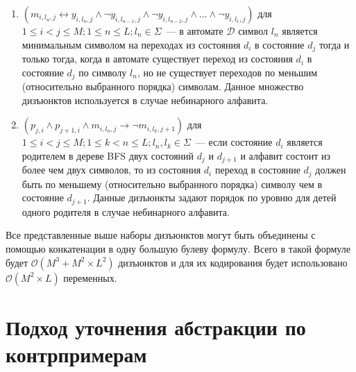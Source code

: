\begin{enumerate}
  \item $\left(m_{i,l_{n},j} \leftrightarrow y_{i,l_{n},j} \wedge \neg y_{i,l_{n - 1}, j} \wedge \neg y_{i,l_{n - 2}, j} \wedge \ldots \wedge \neg y_{i,l_{1},j} \right)$ для $1 \leq i < j \leq M; 1 \leq n \leq L;l_{n} \in \Sigma$~{---} в автомате $\mathcal{D}$ символ $l_{n}$ является минимальным символом на переходах из состояния $d_{i}$ в состояние $d_{j}$ тогда и только тогда, когда в автомате существует переход из состояния $d_{i}$ в состояние $d_{j}$ по символу $l_{n}$, но не существует переходов по меньшим (относительно выбранного порядка) символам.
  Данное множество дизъюнктов используется в случае небинарного алфавита.

  \item $\left(p_{j,i} \wedge p_{j + 1, i} \wedge m_{i,l_{n}, j} \rightarrow \neg m_{i, l_{k}, j + 1}\right)$ для $1 \leq i < j \leq M; 1 \leq k < n \leq L;l_n,l_k \in \Sigma$~{---} если состояние $d_{i}$ является родителем в дереве BFS двух состояний $d_{j}$ и $d_{j + 1}$ и алфавит состоит из более чем двух символов, то из состояния $d_{i}$ переход в состояние $d_{j}$ должен быть по меньшему (относительно выбранного порядка) символу чем в состояние $d_{j + 1}$.
  Данные дизъюнкты задают порядок по уровню для детей одного родителя в случае небинарного алфавита.
\end{enumerate}

Все представленные выше наборы дизъюнктов могут быть объединены с помощью конкатенации в одну большую булеву формулу. Всего в такой формуле будет $\mathcal{O}(M^{3} + M^{2} \times L^{2})$ дизъюнктов и для их кодирования будет использовано $\mathcal{O}(M^2 \times L)$ переменных.


\section{Подход уточнения абстракции по контрпримерам}
\label{sec:review:cegar}

